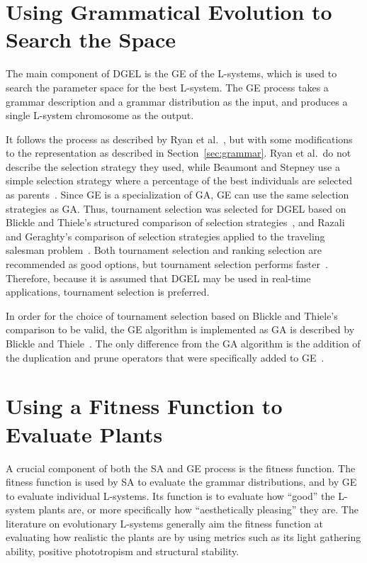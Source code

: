 \section{Using Grammatical Evolution to Search the Space}
The main component of \gls{DGEL} is the \gls{GE} of the \glspl{L-system}, which is used to search the parameter space for the best \gls{L-system}.
The \gls{GE} process takes a grammar description and a grammar distribution as the input, and produces a single \gls{L-system} chromosome as the output.

It follows the process as described by Ryan et al.~\cite{1998Ryan}, but with some modifications to the representation as described in Section~\ref{sec:grammar}.
Ryan et al.\ do not describe the selection strategy they used, while Beaumont and Stepney use a simple selection strategy where a percentage of the best individuals are selected as parents~\cite{2009Beaumont}.
Since \gls{GE} is a specialization of \gls{GA}, \gls{GE} can use the same selection strategies as \gls{GA}.
Thus, tournament selection was selected for \gls{DGEL} based on Blickle and Thiele's structured comparison of selection strategies~\cite{1995Blickle}, and Razali and Geraghty's comparison of selection strategies applied to the traveling salesman problem~\cite{2011Razali}.
Both tournament selection and ranking selection are recommended as good options, but tournament selection performs faster~\cite{1995Blickle}.
Therefore, because it is assumed that \gls{DGEL} may be used in real-time applications, tournament selection is preferred.

In order for the choice of tournament selection based on Blickle and Thiele's comparison to be valid, the \gls{GE} algorithm is implemented as \gls{GA} is described by Blickle and Thiele~\cite{1995Blickle}.
The only difference from the \gls{GA} algorithm is the addition of the duplication and prune operators that were specifically added to \gls{GE}~\cite{1998Ryan}.

\section{Using a Fitness Function to Evaluate Plants}
A crucial component of both the \gls{SA} and \gls{GE} process is the fitness function.
The fitness function is used by \gls{SA} to evaluate the grammar distributions, and by \gls{GE} to evaluate individual \glspl{L-system}.
Its function is to evaluate how ``good'' the \gls{L-system} plants are, or more specifically how ``aesthetically pleasing'' they are.
The literature on evolutionary \glspl{L-system} generally aim the fitness function at evaluating how realistic the plants are by using metrics such as its light gathering ability, positive phototropism and structural stability.

